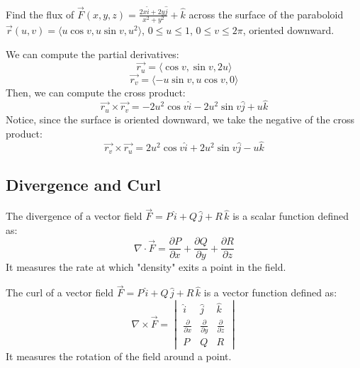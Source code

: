\documentclass[11pt]{report}
\begin{document}
\begin{example}
    Find the flux of $\vec{F}(x,y,z) = \frac{2x \hat{i} + 2y \hat{j}}{x^2 + y^2} + \hat{k}$ across the surface of the paraboloid $\vec{r}(u, v) = \langle u \cos v, u \sin v, u^2 \rangle$, $0 \leq u \leq 1$, $0 \leq v \leq 2\pi$, oriented downward.

    We can compute the partial derivatives:
    $$        \vec{r_u} = \langle \cos v, \sin v, 2u \rangle $$
    $$        \vec{r_v} = \langle -u \sin v, u \cos v, 0 \rangle $$
    Then, we can compute the cross product:
    $$        \vec{r_u} \times \vec{r_v} = -2u^2 \cos v \hat{i} - 2u^2 \sin v \hat{j} + u \hat{k}
    $$
    Notice, since the surface is oriented downward, we take the negative of the cross product:
    $$        \vec{r_v} \times \vec{r_u} = 2u^2 \cos v \hat{i} + 2u^2 \sin v \hat{j} - u \hat{k}
    $$
\end{example}
\subsection{Divergence and Curl}

\begin{definition}[Divergence]
    The divergence of a vector field \(\vec{F} = P \, \hat{i} + Q \, \hat{j} + R \, \hat{k}\) is a scalar function defined as:
    \begin{equation}
        \nabla \cdot \vec{F} = \frac{\partial P}{\partial x} + \frac{\partial Q}{\partial y} + \frac{\partial R}{\partial z}
    \end{equation}
    It measures the rate at which "density" exits a point in the field.
\end{definition}


\begin{definition}[Curl]
    The curl of a vector field \(\vec{F} = P \, \hat{i} + Q \, \hat{j} + R \, \hat{k}\) is a vector function defined as:
    \begin{equation}
        \nabla \times \vec{F} = \begin{vmatrix}
            \hat{i} & \hat{j} & \hat{k} \\
            \frac{\partial}{\partial x} & \frac{\partial}{\partial y} & \frac{\partial}{\partial z} \\
            P & Q & R
        \end{vmatrix}
    \end{equation}
    It measures the rotation of the field around a point.
\end{definition}
\end{document}
